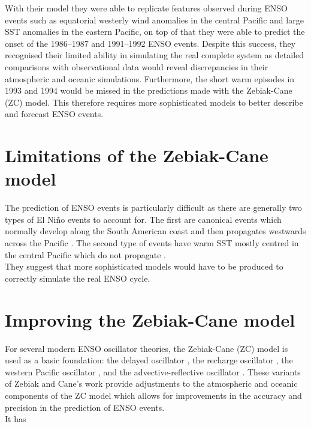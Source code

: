 \documentclass[12pt, onecolumn]{revtex4}    %
\begin{document}
With their model they were able to replicate features observed during ENSO events such as equatorial westerly wind anomalies in the central Pacific and large SST anomalies in the eastern Pacific, on top of that they were able to predict the onset of the 1986--1987 and 1991--1992 ENSO events. Despite this success, they recognised their limited ability in simulating the real complete system as detailed comparisons with observational data would reveal discrepancies in their atmospheric and oceanic simulations. Furthermore, the short warm episodes in 1993 and 1994 would be missed in the predictions made with the Zebiak-Cane (ZC) model. This therefore requires more sophisticated models to better describe and forecast ENSO events. \\

\section{Limitations of the Zebiak-Cane model}

The prediction of ENSO events is particularly difficult as there are generally two types of El Ni\~{n}o events to account for. The first are canonical events which normally develop along the South American coast and then propagates westwards across the Pacific \citep{rasmusson1982variations}. The second type of events have warm SST mostly centred in the central Pacific which do not propagate \citep{ashok2007nino}.  \\

They suggest that more sophisticated models would have to be produced to correctly simulate the real ENSO cycle. 

\section{Improving the Zebiak-Cane model}

For several modern ENSO oscillator theories, the Zebiak-Cane (ZC) model is used as a basic foundation: the delayed oscillator \citep{Suarez:1988aa, Battisti:1988aa}, the recharge oscillator \citep{Jin:1997aa}, the western Pacific oscillator \citep{Weisberg:1997aa, wang1999effects}, and the advective-reflective oscillator \citep{Picaut663}. These variants of Zebiak and Cane's work provide adjustments to the atmospheric and oceanic components of the ZC model which allows for improvements in the accuracy and precision in the prediction of ENSO events. \\

It has 



\newpage

\nocite{ruddiman_climate}


\end{document}

